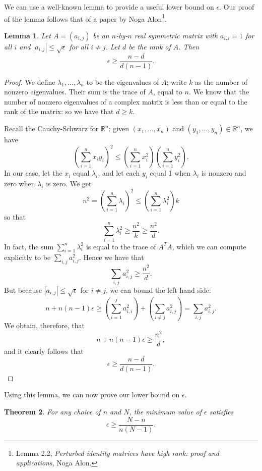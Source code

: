 \documentclass[11pt,letterpaper,twoside,english]{article}
\theoremstyle{theorem}
\newtheorem{theorem}{Theorem}[section]
\newtheorem{lemma}[theorem]{Lemma}
\theoremstyle{remark}
\begin{document}
We can use a well-known lemma to provide a useful lower bound on $\epsilon$. Our proof of the lemma follows that of a paper by Noga Alon\footnote{Lemma 2.2, \emph{Perturbed identity matrices have high rank: proof and applications}, Noga Alon.}.

\begin{lemma}
Let $A=(a_{i,j})$ be an $n$-by-$n$ real symmetric matrix with $a_{i,i}=1$ for all $i$ and $|a_{i,j}|\leq \sqrt{\epsilon}$ for all $i\neq j$. Let $d$ be the rank of $A$. Then
\[\epsilon\geq \frac{n-d}{d(n-1)}.\]
\end{lemma}
\begin{proof}
We define $\lambda_1,\ldots, \lambda_n$ to be the eigenvalues of $A$; write $k$ as the number of nonzero eigenvalues. Their sum is the trace of $A$, equal to $n$. We know that the number of nonzero eigenvalues of a complex matrix is less than or equal to the rank of the matrix: so we have that $d\geq k$.

Recall the Cauchy-Schwarz for $\mathbb R^n$: given $(x_1,\ldots, x_n)$ and $(y_1,\ldots, y_n)\in \mathbb R^n$, we have
\[\left(\sum_{i=1}^nx_iy_i\right)^2\leq \left(\sum_{i=1}^n x_i^2\right)\left(\sum_{i=1}^ny_i^2\right).\]
In our case, let the $x_i$ equal $\lambda_i$, and let each $y_i$ equal 1 when $\lambda_i$ is nonzero and zero when $\lambda_i$ is zero. We get
\[n^2=\left(\sum_{i=1}^n \lambda_i\right)^2\leq \left(\sum_{i=1}^n \lambda_i^2\right) k\]
so that
\[\sum_{i=1}^n \lambda_i^2\geq\frac{n^2}{k}\geq \frac{n^2}{d}.\]
In fact, the sum $\sum_{i=1}^n \lambda_i^2$ is equal to the trace of $A^TA$, which we can compute explicitly to be $\sum_{i,j}a_{i,j}^2$. Hence we have that
\[\sum_{i,j}a_{i,j}^2\geq \frac{n^2}{d}.\]
But because $|a_{i,j}|\leq \sqrt\epsilon$ for $i\neq j$, we can bound the left hand side:
\[n+n(n-1)\epsilon\geq \left(\sum_{i=1}^j a_{i,i}^2\right)+\left(\sum_{i\neq j}a_{i,j}^2\right)=\sum_{i,j}a_{i,j}^2.\]
We obtain, therefore, that
\[n+n(n-1)\epsilon\geq \frac{n^2}{d},\]
and it clearly follows that
\[\epsilon\geq \frac{n-d}{d(n-1)}.\]
\end{proof}
Using this lemma, we can now prove our lower bound on $\epsilon$.
\begin{theorem}
\label{lower_bound}
For any choice of $n$ and $N$, the minimum value of $\epsilon$ satisfies
\[\epsilon\geq \frac{N-n}{n(N-1)}.\]
\end{theorem}
\end{document}
